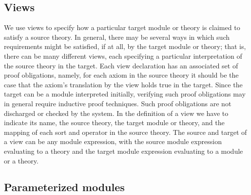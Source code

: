 \subsection{Views}\label{subsec:views}

We use views to specify how a particular target module or theory is claimed
to satisfy a source theory. In general, there may be several ways in which 
such requirements might be satisfied, if at all, by the target module or
theory; that is, there can be many different views, each specifying a
particular interpretation of the source theory in the target. Each
view declaration has an associated set of proof obligations, namely, for
each axiom in the source theory it should be the case that the axiom's
translation by the view holds true in the target. Since the target can
be a module interpreted initially, verifying such proof obligations may
in general require inductive proof techniques. Such proof obligations
are not discharged or checked by the system. 
In the definition of a view we have to indicate its name, the source
theory, the target module or theory, and the mapping of each sort and
operator in the source theory. The source and target of a
view can be any module expression, with the source module expression
evaluating to a theory and the target module expression evaluating to a
module or a theory.

\subsection{Parameterized modules}\label{subsec:pmod}





















